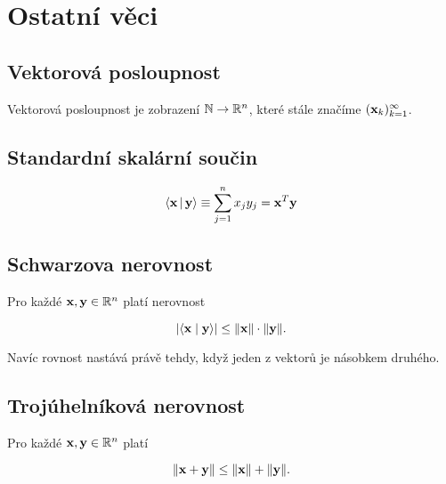 \section{Ostatní věci}

\subsection*{Vektorová posloupnost}

Vektorová posloupnost je zobrazení $\mathbb{N} \to \mathbb{R}^n$, které stále značíme
$(\mathbf{x}_k)_{k=1}^\infty$.

\subsection*{Standardní skalární součin}

\[ \langle \mathbf{x} \,|\, \mathbf{y} \rangle \equiv \sum_{j=1}^n x_j y_j = \mathbf{x}^T \mathbf{y}\]

\subsection*{Schwarzova nerovnost}

Pro každé $\mathbf{x},\mathbf{y}\in\mathbb{R}^n$ platí nerovnost

\[ |\langle \mathbf{x} \mid \mathbf{y} \rangle| \leq \|\mathbf{x}\| \cdot \|\mathbf{y}\|. \]

\noindent Navíc rovnost nastává právě tehdy, když jeden z vektorů je násobkem druhého.

\subsection*{Trojúhelníková nerovnost}

Pro každé $\mathbf{x},\mathbf{y}\in\mathbb{R}^n$ platí

\[ \|\mathbf{x} + \mathbf{y}\| \leq \|\mathbf{x}\| + \|\mathbf{y}\|. \]

\pagebreak
